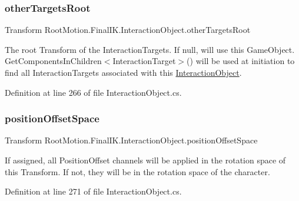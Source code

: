 \subsubsection{\texorpdfstring{other\+Targets\+Root}{otherTargetsRoot}}
{\footnotesize\ttfamily Transform Root\+Motion.\+Final\+I\+K.\+Interaction\+Object.\+other\+Targets\+Root}



The root Transform of the Interaction\+Targets. If null, will use this Game\+Object. Get\+Components\+In\+Children$<$\+Interaction\+Target$>$() will be used at initiation to find all Interaction\+Targets associated with this \mbox{\hyperlink{class_root_motion_1_1_final_i_k_1_1_interaction_object}{Interaction\+Object}}. 



Definition at line 266 of file Interaction\+Object.\+cs.

\mbox{\label{class_root_motion_1_1_final_i_k_1_1_interaction_object_a48b9b33f43b92c3f6fb5d5a8108c1dfb}} 
\subsubsection{\texorpdfstring{position\+Offset\+Space}{positionOffsetSpace}}
{\footnotesize\ttfamily Transform Root\+Motion.\+Final\+I\+K.\+Interaction\+Object.\+position\+Offset\+Space}



If assigned, all Position\+Offset channels will be applied in the rotation space of this Transform. If not, they will be in the rotation space of the character. 



Definition at line 271 of file Interaction\+Object.\+cs.

\mbox{\label{class_root_motion_1_1_final_i_k_1_1_interaction_object_a3ae0829b89959bc751999003d7e3fd95}} 

